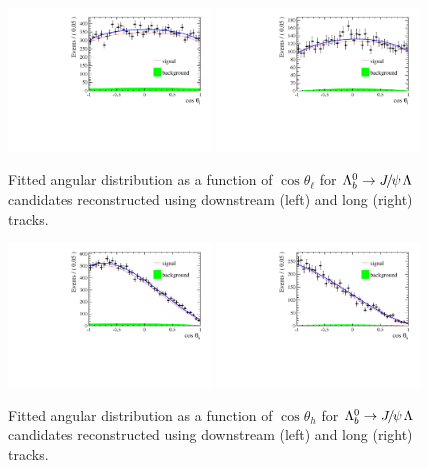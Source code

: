 %
\begin{figure}[h]
\centering
\includegraphics[width=0.48\textwidth]{Lmumu/figs/AngularDistribs/Fitted/Afb_DD_jpsi.pdf}
\includegraphics[width=0.48\textwidth]{Lmumu/figs/AngularDistribs/Fitted/Afb_LL_jpsi.pdf}
\caption{Fitted angular distribution as a function of $\cos\theta_\ell$ for $\Lb\to\jpsi\Lz$ candidates
reconstructed using downstream (left) and long (right) tracks. }
\label{fig:AngFitJpsi}
\end{figure}
%
\begin{figure}[h]
\centering
\includegraphics[width=0.48\textwidth]{Lmumu/figs/AngularDistribs/Fitted/AfbB_DD_jpsi.pdf}
\includegraphics[width=0.48\textwidth]{Lmumu/figs/AngularDistribs/Fitted/AfbB_LL_jpsi.pdf}
\caption{Fitted angular distribution as a function of $\cos\theta_h$ for $\Lb\to\jpsi\Lz$ candidates
reconstructed using downstream (left) and long (right) tracks.  }
\label{fig:AngFitBJpsi}
\end{figure}







